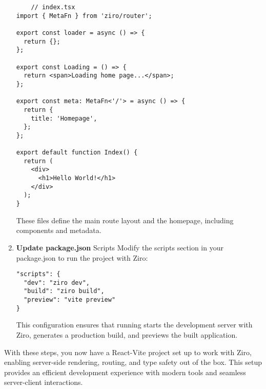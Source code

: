 \begin{enumerate}
  \begin{verbatim}
    // index.tsx
import { MetaFn } from 'ziro/router';

export const loader = async () => {
  return {};
};

export const Loading = () => {
  return <span>Loading home page...</span>;
};

export const meta: MetaFn<'/'> = async () => {
  return {
    title: 'Homepage',
  };
};

export default function Index() {
  return (
    <div>
      <h1>Hello World!</h1>
    </div>
  );
}
      \end{verbatim}
      These files define the main route layout and the homepage, including components and metadata.


      \item \textbf{Update package.json} Scripts Modify the scripts section in your package.json to run the project with Ziro:
\begin{verbatim}
"scripts": {
  "dev": "ziro dev",
  "build": "ziro build",
  "preview": "vite preview"
}
\end{verbatim}
This configuration ensures that running  starts the development server with Ziro,  generates a production build, and  previews the built application.


\end{enumerate}

With these steps, you now have a React-Vite project set up to work with Ziro, enabling server-side rendering, routing, and type safety out of the box. This setup provides an efficient development experience with modern tools and seamless server-client interactions.

\pagebreak
